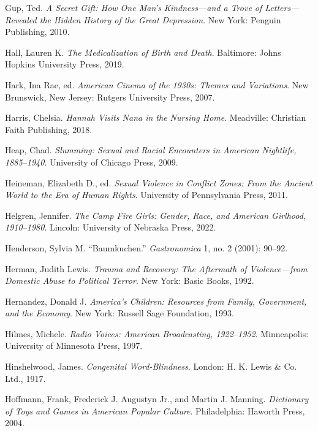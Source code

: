 \documentclass[
  letterpaper,
]{book}
\newlength{\cslhangindent}
\newenvironment{CSLReferences}[2] %
 {\begin{list}{}{%
  \setlength{\itemindent}{0pt}
  \setlength{\leftmargin}{0pt}
  \setlength{\parsep}{0pt}
  \ifodd #1
   \setlength{\leftmargin}{\cslhangindent}
   \setlength{\itemindent}{-1\cslhangindent}
  \fi
  \setlength{\itemsep}{#2\baselineskip}}}
 {\end{list}}
\begin{document}
\begin{CSLReferences}{1}{0}
Gup, Ted. \emph{A Secret Gift: How One Man's Kindness---and a Trove of
Letters---Revealed the Hidden History of the Great Depression}. New
York: Penguin Publishing, 2010.

Hall, Lauren K. \emph{The Medicalization of Birth and Death}. Baltimore:
Johns Hopkins University Press, 2019.

Hark, Ina Rae, ed. \emph{American Cinema of the 1930s: Themes and
Variations}. New Brunswick, New Jersey: Rutgers University Press, 2007.

Harris, Chelsia. \emph{Hannah Visits Nana in the Nursing Home}.
Meadville: Christian Faith Publishing, 2018.

Heap, Chad. \emph{Slumming: Sexual and Racial Encounters in American
Nightlife, 1885--1940}. University of Chicago Press, 2009.

Heineman, Elizabeth D., ed. \emph{Sexual Violence in Conflict Zones:
From the Ancient World to the Era of Human Rights}. University of
Pennsylvania Press, 2011.

Helgren, Jennifer. \emph{The Camp Fire Girls: Gender, Race, and American
Girlhood, 1910--1980}. Lincoln: University of Nebraska Press, 2022.

Henderson, Sylvia M. {``Baumkuchen.''} \emph{Gastronomica} 1, no. 2
(2001): 90--92.

Herman, Judith Lewis. \emph{Trauma and Recovery: The Aftermath of
Violence---from Domestic Abuse to Political Terror}. New York: Basic
Books, 1992.

Hernandez, Donald J. \emph{America's Children: Resources from Family,
Government, and the Economy}. New York: Russell Sage Foundation, 1993.

Hilmes, Michele. \emph{Radio Voices: American Broadcasting, 1922--1952}.
Minneapolis: University of Minnesota Press, 1997.

Hinshelwood, James. \emph{Congenital Word-Blindness}. London: H. K.
Lewis \& Co. Ltd., 1917.

Hoffmann, Frank, Frederick J. Augustyn Jr., and Martin J. Manning.
\emph{Dictionary of Toys and Games in American Popular Culture}.
Philadelphia: Haworth Press, 2004.


\end{CSLReferences}
\end{document}
